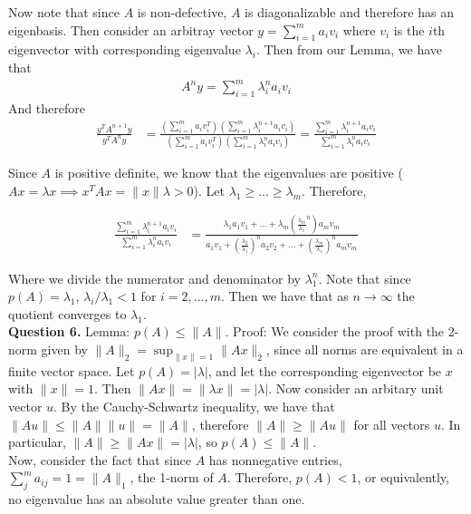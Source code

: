 \documentclass{article}
\newcommand{\ra}{\longrightarrow}
\begin{document}
Now note that since $A$ is non-defective, $A$ is diagonalizable and therefore has an eigenbasis. Then consider an arbitray vector $y =\sum_{i=1}^m a_i v_i$ where $v_i$ is the $i$th eigenvector with corresponding eigenvalue $\lambda_i$. Then from our Lemma, we have that 
\begin{align*}
    A^n y = \sum_{i=1}^m \lambda_i^na_i v_i
\end{align*}
And therefore 
\begin{align*}
    \frac{y^T A^{n+1}y}{y^TA^n y} &= \frac{(\sum_{i=1}^m a_iv_i^T)(\sum_{i=1}^m \lambda_i^{n+1}a_i v_i)}{(\sum_{i=1}^m a_iv_i^T)(\sum_{i=1}^m \lambda_i^{n}a_i v_i)} = \frac{\sum_{i=1}^m \lambda_i^{n+1}a_i v_i}{\sum_{i=1}^m \lambda_i^{n}a_i v_i}
\end{align*}

Since $A$ is positive definite, we know that the eigenvalues are positive ($A x = \lambda x \implies x^TAx = \|x\| \lambda > 0$). Let $\lambda_1 \geq ... \geq \lambda_m$. Therefore, 

\begin{align*}
    \frac{\sum_{i=1}^m \lambda_i^{n+1}a_i v_i}{\sum_{i=1}^m \lambda_i^{n}a_i v_i} &= \frac{\lambda_1 a_1v_1+...+\lambda_m \left(\frac{\lambda_m}{\lambda_1}^n\right)a_mv_m}{a_1v_1+\left(\frac{\lambda_2}{\lambda_1}\right)^n a_2v_2 + ... +\left(\frac{\lambda_m}{\lambda_1}\right)^n a_m v_m}
\end{align*}

Where we divide the numerator and denominator by $\lambda_1^n$. Note that since $p(A)=\lambda_1$, $\lambda_i / \lambda_1 < 1$ for $i=2,...,m$. Then we have that as 
$n \ra \infty$ the quotient converges to $\lambda_1$. \\

\textbf{Question 6.} Lemma: $p(A) \leq \|A\|$. Proof: We consider the proof with the 2-norm given by $\|A\|_2 = \sup_{\|x\| = 1}\|Ax\|_2$, since all norms are equivalent in a finite vector space. Let $p(A) = |\lambda|$, and let the corresponding eigenvector be $x$ with $\|x\| = 1$. Then $\|Ax\| = \|\lambda x\| = |\lambda|$. Now consider an arbitary unit vector $u$. By the Cauchy-Schwartz inequality, we have that $\|Au\| \leq \|A\| \|u\| = \|A\|$, therefore $\|A \| \geq \|A u\|$ for all vectors $u$. In particular, $\|A\| \geq \|Ax\| = |\lambda|$, so $p(A) \leq \|A\|$. \\

Now, consider the fact that since $A$ has nonnegative entries, $\sum_{j}^m a_{ij}=1=\|A\|_1$, the 1-norm of $A$. Therefore, $p(A) < 1$, or equivalently, no eigenvalue has an absolute value greater than one. \\
\end{document}
